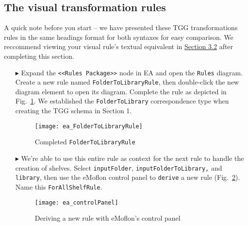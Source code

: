 \newpage
\hypertarget{treeToModel vis}{}
\subsection{The visual transformation rules}
\visHeader

A quick note before you start -- we have presented these TGG transformations rules in the same headings format for both syntaxes for easy comparison. We
reccommend viewing your visual rule's textual equivalent in \hyperlink{treeToModel tex}{Section 3.2} after completing this section.

\begin{itemize}

\subsubsection{FolderToLibraryRule} %

\item[$\blacktriangleright$] Expand the \texttt{<<Rules Package>>} node in EA and open the \texttt{Rules} diagram. Create a new rule named
\texttt{FolderToLibraryRule}, then double-click the new diagram element to open its diagram. Complete the rule as depicted in
Fig.~\ref{ea:FolderIntoLibrary_Complete}. We established the \texttt{FolderToLibrary} correspondence type when creating the TGG schema in Section 1.

\vspace{0.5cm}

\begin{figure}[htbp]
\begin{center}
  \texttt{[image: ea\_FolderToLibraryRule]}
  \caption{Completed \texttt{FolderToLibraryRule}}
  \label{ea:FolderIntoLibrary_Complete}
\end{center}
\end{figure}

\item[$\blacktriangleright$] We're able to use this entire rule as context for the next rule to handle the creation of shelves. Select
\texttt{inputFolder}, \texttt{in\-put\-Fol\-der\-To\-Lib\-rary,} and \texttt{library}, then use the eMoflon control panel to \texttt{derive} a new rule
(Fig.~\ref{ea:controlPanel}).
Name this \texttt{ForAllShelfRule}.

\vspace{0.5cm}

\begin{figure}[htbp]
\begin{center}
  \texttt{[image: ea\_controlPanel]}
  \caption{Deriving a new rule with eMoflon's control panel}
  \label{ea:controlPanel}
\end{center}
\end{figure}


\end{itemize}
